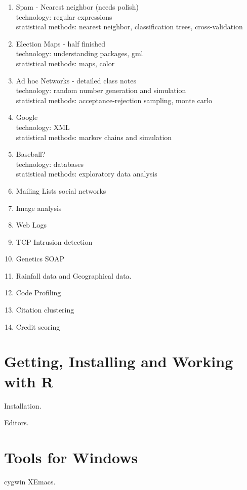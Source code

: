 \documentclass[11pt,timesroman]{article}
\begin{document}
\begin{enumerate}
\item{Spam - Nearest neighbor (needs polish)}
\\
technology: regular expressions
\\
statistical methods: nearest neighbor, classification trees,
cross-validation

\item{Election Maps - half finished}
\\
technology: understanding packages, gml
\\
statistical methods: maps, color


\item{Ad hoc Networks - detailed class notes}
\\
technology: random number generation and simulation
\\
statistical methods: acceptance-rejection sampling, monte carlo


\item{Google}
\\
technology: XML
\\
statistical methods: markov chains and simulation

\item{Baseball?}
\\
technology: databases
\\
statistical methods: exploratory data analysis


\item{Mailing Lists}
social networks


\item{Image analysis}

\item{Web Logs}

\item{TCP Intrusion detection}

\item{Genetics}
        SOAP

\item{Rainfall data and Geographical data.}
\item{Code Profiling}

\item{Citation clustering}


\item{Credit scoring}


\end{enumerate}

\appendix

\section{Getting, Installing and Working with R}
Installation.

Editors.


\section{Tools for Windows}

cygwin
XEmacs.
\end{document}
